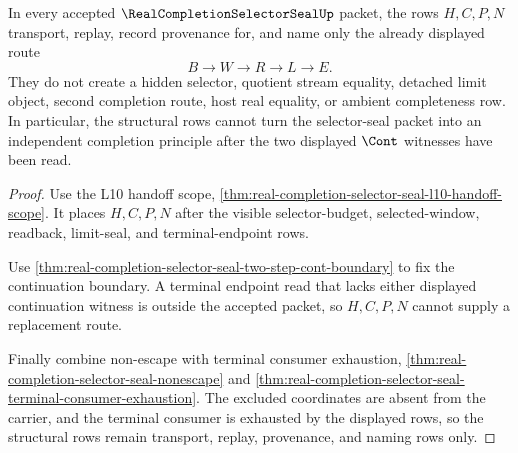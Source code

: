 \begin{theorem}
\label{thm:real-completion-selector-seal-structural-row-nonpromotion}
In every accepted $\RealCompletionSelectorSealUp$ packet, the rows $H,C,P,N$ transport, replay, record provenance for, and name only the already displayed route
$$
B \to W \to R \to L \to E.
$$
They do not create a hidden selector, quotient stream equality, detached limit object, second completion route, host real equality, or ambient completeness row. In particular, the structural rows cannot turn the selector-seal packet into an independent completion principle after the two displayed $\Cont$ witnesses have been read.
\end{theorem}
\begin{proof}
Use the L10 handoff scope, \autoref{thm:real-completion-selector-seal-l10-handoff-scope}. It places $H,C,P,N$ after the visible selector-budget, selected-window, readback, limit-seal, and terminal-endpoint rows.

Use \autoref{thm:real-completion-selector-seal-two-step-cont-boundary} to fix the continuation boundary. A terminal endpoint read that lacks either displayed continuation witness is outside the accepted packet, so $H,C,P,N$ cannot supply a replacement route.

Finally combine non-escape with terminal consumer exhaustion, \autoref{thm:real-completion-selector-seal-nonescape} and \autoref{thm:real-completion-selector-seal-terminal-consumer-exhaustion}. The excluded coordinates are absent from the carrier, and the terminal consumer is exhausted by the displayed rows, so the structural rows remain transport, replay, provenance, and naming rows only.
\end{proof}

